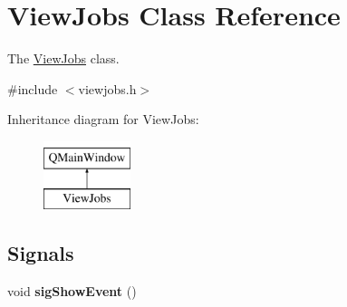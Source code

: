 \hypertarget{class_view_jobs}{}\section{View\+Jobs Class Reference}
\label{class_view_jobs}


The \mbox{\hyperlink{class_view_jobs}{View\+Jobs}} class.  




{\ttfamily \#include $<$viewjobs.\+h$>$}

Inheritance diagram for View\+Jobs\+:\begin{figure}[H]
\begin{center}
\leavevmode
\includegraphics[height=2.000000cm]{class_view_jobs}
\end{center}
\end{figure}
\subsection*{Signals}
\begin{DoxyCompactItemize}
\item 
\mbox{\label{class_view_jobs_a6fe28a8ba9112250d4337d02e0abedbd}} 
void {\bfseries sig\+Show\+Event} ()
\end{DoxyCompactItemize}
